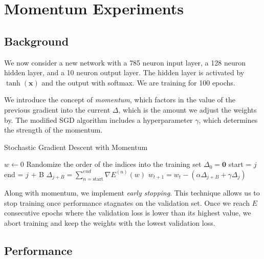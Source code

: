 \section{Momentum Experiments}

\subsection{Background}

We now consider a new network with a 785 neuron input layer, a 128 neuron
hidden layer, and a 10 neuron output layer. The hidden layer is activated by
$\tanh(\mathbf x)$ and the output with softmax. We are training for 100 epochs.

We introduce the concept of \textit{momentum}, which factors in the value of the
previous gradient into the current $\Delta$, which is the amount we adjust the weights by.
The modified SGD algorithm includes a hyperparameter $\gamma$, which determines the strength
of the momentum.

\begin{algorithm}
	\caption{Stochastic Gradient Descent with Momentum}
	\begin{algorithmic}
		\State $w \gets 0$
		\State Randomize the order of the indices into the training set
		\State $\Delta_{0} = \mathbf 0$
		\State start = $j$
		\State end = $j$ + B
		\State $\Delta_{j+B} = \sum_{n = \text{start}}^{end} \nabla E^{(n)}(w)$
		\State $w_{t + 1} = w_t - (\alpha \Delta_{j+B} + \gamma \Delta_{j})$
		\EndFor
		\EndFor
	\end{algorithmic}
\end{algorithm}


Along with momentum, we implement \textit{early stopping}. This technique allows us
to stop training once performance stagnates on the validation set. Once  we reach
$E$ consecutive epochs where the validation loss is lower than its highest value, we
abort training and keep the weights with the lowest validation loss.


\subsection{Performance}


